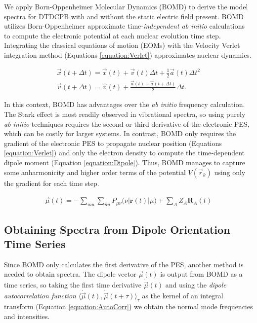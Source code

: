 \documentclass[journal=jpclcd, manuscript=letter, layout=twocolumn]{achemso}
\begin{document}
\par We apply Born-Oppenheimer Molecular Dynamics (BOMD) to derive the model spectra for DTDCPB with and without the static electric field present. BOMD utilizes Born-Oppenheimer approximate time-\emph{independent ab initio} calculations to compute the electronic potential at each nuclear evolution time step.  Integrating the classical equations of motion (EOMs) with the Velocity Verlet integration method (Equations \ref{equation:Verlet}) approximates nuclear dynamics. \cite{g09} 

\begin{equation}
\begin{split}
\vec{x}(t + \Delta t) = \vec{x}(t) + \vec{v}(t)\Delta t + \frac{1}{2} \vec{a}(t)\Delta t^{2}\\
\vec{v}(t + \Delta t) = \vec{v}(t) + \frac{\vec{a}(t) + \vec{a}(t + \Delta t)}{2}\Delta t.
\label{equation:Verlet}
\end{split}
\end{equation}

In this context, BOMD has advantages over the \emph{ab initio} frequency calculation. \cite{g09, thomas} The Stark effect is most readily observed in vibrational spectra, so using purely \emph{ab initio} techniques requires the second or third derivative of the electronic PES, which can be costly for larger systems. In contrast, BOMD only requires the gradient of the electronic PES to propagate nuclear position (Equations \ref{equation:Verlet}) and only the electron density to compute the time-dependent dipole moment (Equation \ref{equation:Dipole}). Thus, BOMD manages to capture some  anharmonicity and higher order terms of the potential $V(\vec{r}_{k})$ using only the gradient for each time step. \cite{g09} 

\begin{equation}
\begin{split}
\vec{\mu}(t) = -\sum_{mu}\sum_{nu} P_{\mu\nu}\big(\nu | \mathbf{r}(t) | \mu \big) + \sum_{A} Z_{A}\mathbf{R}_{A}(t)
\label{equation:Dipole}
\end{split}
\end{equation}

\subsection{Obtaining Spectra from Dipole Orientation Time Series}

Since BOMD only calculates the first derivative of the PES, another method is needed to obtain spectra. The dipole vector $\vec{\mu}(t)$  is output from BOMD as a time series, so taking the first time derivative $\dot{\vec{\mu}}(t)$ and using the \emph{dipole autocorrelation function} $\langle \dot{\vec{\mu}}(t), \dot{\vec{\mu}}(t + \tau) \rangle_{\tau}$ as the kernel of an integral transform (Equation \ref{equation:AutoCorr}) we obtain the normal mode frequencies and intensities. \cite{thomas}
\end{document}
